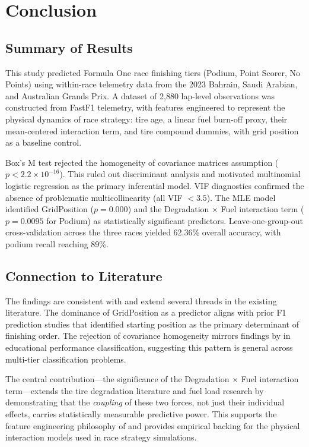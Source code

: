 \section{Conclusion}

\subsection{Summary of Results}

This study predicted Formula One race finishing tiers (Podium, Point Scorer,
No Points) using within-race telemetry data from the 2023 Bahrain, Saudi
Arabian, and Australian Grands Prix. A dataset of 2,880 lap-level
observations was constructed from FastF1 telemetry, with features engineered
to represent the physical dynamics of race strategy: tire age, a linear fuel
burn-off proxy, their mean-centered interaction term, and tire compound
dummies, with grid position as a baseline control.

Box's M test rejected the homogeneity of covariance matrices assumption
($p < 2.2 \times 10^{-16}$). This ruled out discriminant analysis and
motivated multinomial logistic regression as the primary inferential model.
VIF diagnostics confirmed the absence of problematic multicollinearity (all
VIF $< 3.5$). The MLE model identified GridPosition ($p = 0.000$) and the
Degradation $\times$ Fuel interaction term ($p = 0.0095$ for Podium) as
statistically significant predictors. Leave-one-group-out cross-validation
across the three races yielded 62.36\% overall accuracy, with podium recall
reaching 89\%.

\subsection{Connection to Literature}

The findings are consistent with and extend several threads in the existing
literature. The dominance of GridPosition as a predictor aligns with prior
F1 prediction studies \parencite{kuhn2022f1, song2020} that identified
starting position as the primary determinant of finishing order. The
rejection of covariance homogeneity mirrors findings by
\textcite{mendoza2023} in educational performance classification, suggesting
this pattern is general across multi-tier classification problems.

The central contribution---the significance of the Degradation $\times$ Fuel
interaction term---extends the tire degradation literature
\parencite{perdomo2021tire, baldi2022} and fuel load research
\parencite{oldknow2022fuel} by demonstrating that the \textit{coupling} of
these two forces, not just their individual effects, carries statistically
measurable predictive power. This supports the feature engineering philosophy
of \textcite{santos2020} and provides empirical backing for the physical
interaction models used in race strategy simulations.

